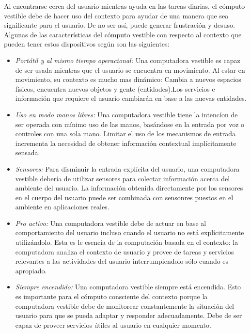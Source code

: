 \documentclass[letterpaper,12pt]{cicese}
\begin{document}
				Al encontrarse cerca del usuario mientras ayuda en las tareas diarias, el c\'omputo vestible debe de hacer uso del contexto para ayudar de una manera
				que sea significante para el usuario. De no ser as\'i, puede generar frustraci\'on y desuso. Algunas de las caracter\'isticas del c\'omputo vestible
				con respecto al contexto que pueden tener estos dispositivos seg\'un \citep{Rhodes97thewearable} son las siguientes:
				\begin{itemize}
					\item{\emph{Port\'atil y al mismo tiempo operacional:}} Una computadora vestible es capaz de ser usada mientras que el usuario se encuentra
					en movimiento. Al estar en movimiento, su contexto es mucho mas din\'amico: Cambia a nuevos espacios f\'isicos, encuentra nuevos objetos 
					y gente (entidades).Los servicios e informaci\'on que requiere el usuario cambiar\'an en base a las nuevas entidades.
				\end{itemize}
				\begin{itemize}
					\item{\emph{Uso en modo manos libres:}} Una computadora vestible tiene la intenc\'ion de ser operada con m\'inimo uso de las manos,
					bas\'andose en la entrada por voz o controles con una sola mano. Limitar el uso de los mecanismos de entrada incrementa la necesidad
					de obtener informaci\'on contextual impl\'icitamente sensada.
				\end{itemize}
				\begin{itemize}
					\item{\emph{Sensores:}} Para disminuir la entrada expl\'icita del usuario, una computadora vestible deber\'ia de utilizar sensores para
					colectar informaci\'on acerca del ambiente del usuario. La informaci\'on obtenida directamente por los sensores en el cuerpo del
					usuario puede ser combinada con sensonres puestos en el ambiente en aplicaciones reales.
				\end{itemize}
				\begin{itemize}
					\item{\emph{Pro activo:}} Una computadora vestible debe de actuar en base al comportamiento del usuario incluso cuando el usuario no
					est\'a expl\'icitamente utiliz\'andolo. Esta es le esencia de la computaci\'on basada en el contexto: la computadora analiza el
					contexto de usuario y provee de tareas y servicios relevantes a las actividades del usuario interrumpiendolo s\'olo cuando es apropiado.
				\end{itemize}
				\begin{itemize}
					\item{\emph{Siempre encendido:}} Una computadora vestible siempre est\'a encendida. Esto es importante para el c\'omputo consciente del contexto
					porque la computadora vestible debe de monitorear constantemente la situaci\'on del usuario para que se pueda adaptar y responder
					adecuadamente. Debe de ser capaz de proveer servicios \'utiles al usuario en cualquier momento.
				\end{itemize}
\end{document}
